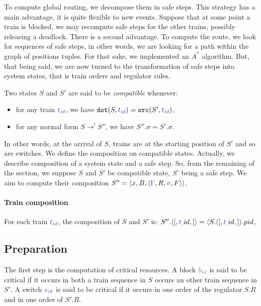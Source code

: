 \documentclass[runningheads]{llncs}
\newcommand{\tuple}[1]{\ensuremath{\langle #1\rangle}}
\newcommand{\posFmt}[1]{{\color{poscolor}{#1}}}
\newcommand{\bid}[1]{\ensuremath{\posFmt{b_{#1}}}}
\newcommand{\swFmt}[1]{{\color{swcolor}{#1}}}
\newcommand{\sid}[1]{\ensuremath{\swFmt{s_{#1}}}}
\newcommand{\switches}{\ensuremath{\swFmt{\sigma}}}
\newcommand{\trainFmt}[1]{{\color{traincolor} #1}}
\newcommand{\trainSeq}{\trainFmt{\Gamma\xspace}}
\newcommand{\tid}[1]{\ensuremath{\trainFmt{t_{#1}}}}
\newcommand{\regulator}{\ensuremath{R}}
\newcommand{\signals}{\ensuremath{F}}
\newcommand{\stateTuple}[4]{\tuple{#1, #2, #3, #4}}
\newcommand{\reduces}{\ensuremath{\rightarrow}}
\newcommand{\redTuple}[3]{\ensuremath{\tuple{#1, #2, #3}}}
\begin{document}
To compute global routing, we decompose them in  safe steps. 
This strategy has a main advantage, it is quite flexible to new events. Suppose that at some point a train is blocked, we may recompute safe steps for the other trains, possibly releasing a deadlock. There is a second advantage. To compute the route, we look for sequences of safe steps, in other words, we are looking for a path within the graph of positions tuples. For that sake, we implemented an $A^*$ algorithm. But, that being said, we are now turned to the transformation of safe steps into system states, that is train orders and regulator rules.

Two states $S$ and $S'$ are said to be \emph{compatible} whenever:
\begin{itemize}
\item for any train $\tid{id}$, we have $\mathtt{dst}(S, \tid{id})  =  \mathtt{src}(S', \tid{id})$,
\item for any normal form $S \reduces^! S''$, we have $S''.\sigma = S'.\sigma$.
\end{itemize}
In other words, at the arrival of $S$, trains are at the starting position of $S'$ and so are switches. We define the composition on compatible states. Actually, we describe composition of a system state and a safe step. So, from the remaining of the section, we suppose $S$ and $S'$ be compatible state, $S'$ being a safe step. We aim to compute their composition $S''  = \redTuple{x}{B}{\stateTuple{\trainSeq}{\regulator}{\switches}{\signals}}$.

\paragraph{Train composition} For each train $\tid{id}$, the composition of $S$ and $S'$ is: $S''.\stateTuple[\tid{id}] = \langle S.\stateTuple[\tid{id}].pid$, 



\subsection{Preparation}

The first step is the computation of critical resources. A block $\bid{id}$ is said to be critical if it occurs in both a train sequence in $S$ occurs an other train sequence in $S'$. A switch $\sid{id}$ is said to be critical if it occurs in one order of the regulator $S.R$ and in one order of $S'.R$. 
\end{document}
